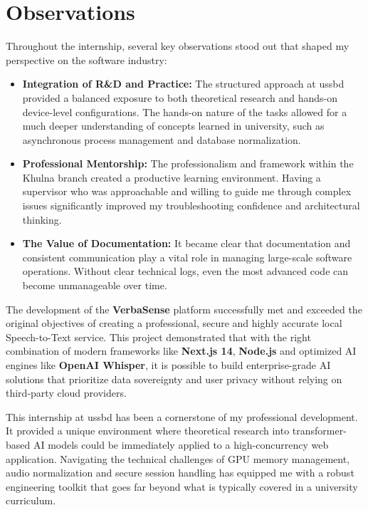 \documentclass[oneside]{thesis-library}
\begin{document}
\section{Observations}
Throughout the internship, several key observations stood out that shaped my perspective on the software industry:
\begin{itemize}
    \item \textbf{Integration of R\&D and Practice:} The structured approach at \Gls{ussbd} provided a balanced exposure to both theoretical research and hands-on device-level configurations. The hands-on nature of the tasks allowed for a much deeper understanding of concepts learned in university, such as asynchronous process management and database normalization.
    \item \textbf{Professional Mentorship:} The professionalism and framework within the Khulna branch created a productive learning environment. Having a supervisor who was approachable and willing to guide me through complex issues significantly improved my troubleshooting confidence and architectural thinking.
    \item \textbf{The Value of Documentation:} It became clear that documentation and consistent communication play a vital role in managing large-scale software operations. Without clear technical logs, even the most advanced code can become unmanageable over time.
\end{itemize}

The development of the \textbf{VerbaSense} platform successfully met and exceeded the original objectives of creating a professional, secure and highly accurate local Speech-to-Text service. This project demonstrated that with the right combination of modern frameworks like \textbf{Next.js 14}, \textbf{Node.js} and optimized AI engines like \textbf{OpenAI Whisper}, it is possible to build enterprise-grade AI solutions that prioritize data sovereignty and user privacy without relying on third-party cloud providers.

This internship at \Gls{ussbd} has been a cornerstone of my professional development. It provided a unique environment where theoretical research into transformer-based AI models could be immediately applied to a high-concurrency web application. Navigating the technical challenges of GPU memory management, audio normalization and secure session handling has equipped me with a robust engineering toolkit that goes far beyond what is typically covered in a university curriculum.
\end{document}
